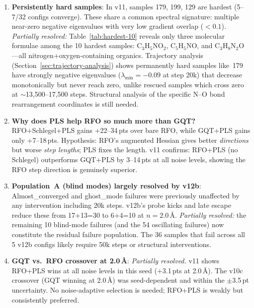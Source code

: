 \documentclass[11pt,a4paper]{article}
\theoremstyle{definition}
\begin{document}
\begin{enumerate}
  \item \textbf{Persistently hard samples}: In v11, samples 179, 199, 129
    are hardest (5--7/32 configs converge).  These share a common spectral
    signature: multiple near-zero negative eigenvalues with very low
    gradient overlap ($<0.1$).  \emph{Partially resolved:}
    Table~\ref{tab:hardest-10} reveals only three molecular formulae
    among the 10 hardest samples: C$_3$H$_5$NO$_2$, C$_5$H$_5$NO, and
    C$_3$H$_8$N$_2$O---all nitrogen+oxygen-containing organics.
    Trajectory analysis (Section~\ref{sec:trajectory-analysis}) shows
    permanently hard samples like~179 have strongly negative eigenvalues
    ($\lambda_\text{min} = -0.09$ at step 20k) that decrease monotonically
    but never reach zero, unlike rescued samples which cross zero at
    $\sim$13{,}500--17{,}500 steps.
    Structural analysis of the specific N--O bond rearrangement coordinates
    is still needed.

  \item \textbf{Why does PLS help RFO so much more than GQT?}
    RFO+Schlegel+PLS gains +22--34\,pts over bare RFO, while GQT+PLS gains
    only +7--18\,pts.  Hypothesis: RFO's augmented Hessian gives better
    \emph{directions} but worse \emph{step lengths}; PLS fixes the length.
    v11 confirms: RFO+PLS (no Schlegel) outperforms GQT+PLS by 3--14\,pts
    at all noise levels, showing the RFO step direction is genuinely
    superior.

  \item \textbf{Population~A (blind modes) largely resolved by v12b}:
    Almost\_converged and ghost\_mode failures were previously unaffected
    by any intervention including 20k steps.  v12b's probe kicks and
    late escape reduce these from 17+13=30 to 6+4=10 at $n=2.0$\,\AA.
    \emph{Partially resolved:} the remaining 10 blind-mode failures
    (and the 54 oscillating failures) now constitute the residual
    failure population.  The 36 samples that fail across all 5 v12b
    configs likely require 50k steps or structural interventions.

  \item \textbf{GQT vs.\ RFO crossover at 2.0\,\AA}: \emph{Partially
    resolved.}  v11 shows RFO+PLS wins at all noise levels in this seed
    ($+$3.1\,pts at 2.0\,\AA).  The v10c crossover (GQT winning at
    2.0\,\AA) was seed-dependent and within the $\pm$3.5\,pt
    uncertainty.  No noise-adaptive selection is needed; RFO+PLS
    is weakly but consistently preferred.


\end{enumerate}
\end{document}
